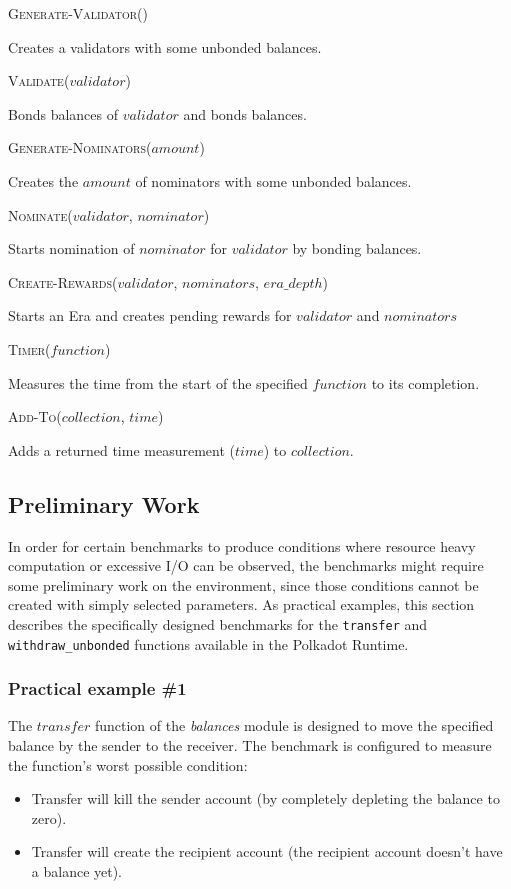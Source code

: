 \documentclass[11pt,a4paper]{article}
\newcommand{\SubItem}[1]{
    {\setlength\itemindent{15pt} \item[-] #1}
}
\begin{document}
\begin{itemize}
  \item \textsc{Generate-Validator()}
  \SubItem{Creates a validators with some unbonded balances.}
  \item \textsc{Validate($validator$)}
  \SubItem{Bonds balances of $validator$ and bonds balances.}
  \item \textsc{Generate-Nominators($amount$)}
  \SubItem{Creates the $amount$ of nominators with some unbonded balances.}
  \item \textsc{Nominate($validator$, $nominator$)}
  \SubItem{Starts nomination of $nominator$ for $validator$ by bonding balances.}
  \item \textsc{Create-Rewards($validator$, $nominators$, $era\_depth$)}
  \SubItem{Starts an Era and creates pending rewards for $validator$ and $nominators$}
  \item \textsc{Timer($function$)} \SubItem{Measures the time from the start of
      the specified $function$ to its completion.}
  \item \textsc{Add-To($collection$, $time$)} \SubItem{Adds a returned time
      measurement ($time$) to $collection$.}
\end{itemize}

\subsection{Preliminary Work}\label{sect:examples-preliminary-work}
In order for certain benchmarks to produce conditions where resource heavy
computation or excessive I/O can be observed, the benchmarks might require some
preliminary work on the environment, since those conditions cannot be created
with simply selected parameters. As practical examples, this section describes
the specifically designed benchmarks for the \verb|transfer| and
\verb|withdraw_unbonded| functions available in the Polkadot Runtime.

\subsubsection{Practical example \#1}
The $transfer$ function of the \textit{balances} module is designed to move the
specified balance by the sender to the receiver. The benchmark is configured to
measure the function's worst possible condition:

\begin{itemize}
  \item Transfer will kill the sender account (by completely depleting the
  balance to zero).
  \item Transfer will create the recipient account (the recipient account
  doesn't have a balance yet).
\end{itemize}
\end{document}

